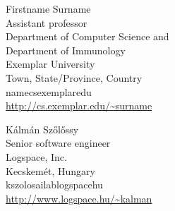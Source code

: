 \begin{frontmatter}
\iffalse %

\tocarxivcategory{!!!}

\fi %

\end{frontmatter}






\begin{tocauthors}
\begin{tocinfo}[surname]
 Firstname Surname\\
 Assistant professor\\
 Department of Computer Science and\\
 Department of Immunology\\
 Exemplar University\\
 Town, State/Province, Country\\
 name\tocat{}cs\tocdot{}exemplar\tocdot{}edu \\   %
 \url{http://cs.exemplar.edu/~surname}      %
\end{tocinfo}
\begin{tocinfo}[szolossy]
  K\'alm\'an Sz\H{o}l\H{o}ssy\\
  Senior software engineer\\
  Logspace, Inc.\\
  Kecskem\'et, Hungary\\
  kszolos\tocat{}ailab\tocdot{}logspace\tocdot{}hu \\
  \url{http://www.logspace.hu/~kalman}
\end{tocinfo}
\end{tocauthors}

